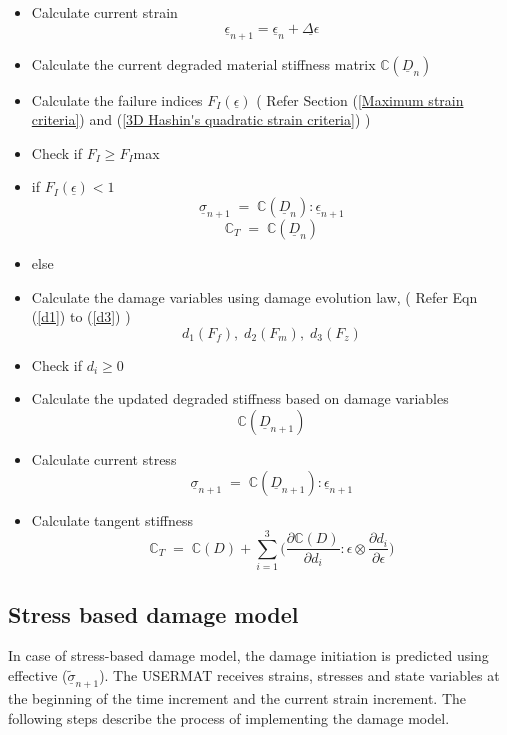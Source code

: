 \documentclass[a4paper,12pt,twoside]{report}
\begin{document}
\begin{itemize}
\item Calculate current strain \textbf{$$ \underline{\epsilon}_{n+1} = \underline{\epsilon}_{n} + \underline{\Delta \epsilon} $$}
\item Calculate the current degraded material stiffness matrix  \textbf{$\mathbb{C}(\underline{D}_{n})$}
\item Calculate the failure indices \textbf{$F_{I}(\underline{\epsilon})$} \;\; ( Refer Section (\ref{Maximum strain criteria}) and (\ref{3D Hashin's quadratic strain criteria}) )
\item[] Check if $F_{I} \geq F_{I}$max
\item if \textbf{$F_{I}(\underline{\epsilon})<1$} \textbf{$$\underline{\sigma}_{n+1} \; = \; \mathbb{C}(\underline{D}_{n}) :  \underline{\epsilon}_{n+1} $$} \textbf{$$\mathbb{C}_{T} \; = \; \mathbb{C}(\underline{D}_{n})$$}
\item else
\item[]  Calculate the damage variables using damage evolution law, \;\; ( Refer Eqn (\ref{d1}) to (\ref{d3}) ) \textbf{$$d_{1}(F_{f}),\;d_{2}(F_{m}),\;d_{3}(F_{z})$$}
\item[]  Check if $d_{i} \geq 0 $ 
\item[]  Calculate the updated degraded stiffness based on damage variables \textbf{$$\mathbb{C}(\underline{D}_{n+1})$$}
\item[]  Calculate current stress  \textbf{$$\underline{\sigma}_{n+1} \; = \; \mathbb{C}(\underline{D}_{n+1}) :  \underline{\epsilon}_{n+1} $$}
\item[] Calculate tangent stiffness \textbf{$$\mathbb{C}_{T}  \; = \;\mathbb{C}(D) + \sum_{i = 1}^{3} \Big( \frac{\partial \mathbb{C}(D) }{\partial d_{i}} : \epsilon \otimes \frac{\partial d_{i}}{\partial \epsilon }\Big)$$}
	
\end{itemize} 


\subsection{Stress based damage model}
\indent\indent\indent  In case of stress-based damage model, the damage initiation is predicted using effective ($\underline{\tilde{\sigma}}_{n+1}$).  The USERMAT receives strains, stresses and state variables at the beginning of the time increment and the current strain increment. The following steps describe the process of implementing the damage model.
\end{document}
